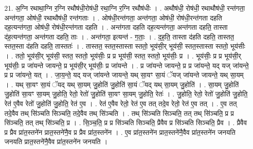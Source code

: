 \documentclass[17pt]{extarticle}
\begin{document}
21. अ॒ग्नि रथाथा॒ग्नि र॒ग्नि रथौष॑धी॒रोष॑धी॒ रथा॒ग्नि र॒ग्नि रथौष॑धीः । . अथौष॑धी॒ रोष॑धी॒ रथाथौष॑धी॒ रन्त॑गता॒ अन्त॑गता॒ ओष॑धी॒ रथाथौष॑धी॒ रन्त॑गताः । . ओष॑धी॒रन्त॑गता॒ अन्त॑गता॒ ओष॑धी॒ रोष॑धी॒रन्त॑गता दहति दह॒त्यन्त॑गता॒ ओष॑धी॒ रोष॑धी॒रन्त॑गता दहति । . अन्त॑गता दहति दह॒त्यन्त॑गता॒ अन्त॑गता दहति॒ तास्ता द॑ह॒त्यन्त॑गता॒ अन्त॑गता दहति॒ ताः । . अन्त॑गता॒ इत्यन्त॑ - ग॒ताः॒ । . द॒ह॒ति॒ तास्ता द॑हति दहति॒ तास्तत॒ स्तत॒स्ता द॑हति दहति॒ तास्ततः॑ । . तास्तत॒ स्तत॒स्तास्ता स्ततो॒ भूय॑सी॒र् भूय॑सी॒ स्तत॒स्तास्ता स्ततो॒ भूय॑सीः । . ततो॒ भूय॑सी॒र् भूय॑सी॒ स्तत॒ स्ततो॒ भूय॑सीः॒ प्र प्र भूय॑सी॒ स्तत॒ स्ततो॒ भूय॑सीः॒ प्र । . भूय॑सीः॒ प्र प्र भूय॑सी॒र् भूय॑सीः॒ प्र जा॑यन्ते जायन्ते॒ प्र भूय॑सी॒र् भूय॑सीः॒ प्र जा॑यन्ते । . प्र जा॑यन्ते जायन्ते॒ प्र प्र जा॑यन्ते॒ यद् यज् जा॑यन्ते॒ प्र प्र जा॑यन्ते॒ यत् । . जा॒य॒न्ते॒ यद् यज् जा॑यन्ते जायन्ते॒ यथ् सा॒यꣳ सा॒यं ॅयज् जा॑यन्ते जायन्ते॒ यथ् सा॒यम् । . यथ् सा॒यꣳ सा॒यं ॅयद् यथ् सा॒यम् जु॒होति॑ जु॒होति॑ सा॒यं ॅयद् यथ् सा॒यम् जु॒होति॑ । . सा॒यम् जु॒होति॑ जु॒होति॑ सा॒यꣳ सा॒यम् जु॒होति॒ रेतो॒ रेतो॑ जु॒होति॑ सा॒यꣳ सा॒यम् जु॒होति॒ रेतः॑ । . जु॒होति॒ रेतो॒ रेतो॑ जु॒होति॑ जु॒होति॒ रेत॑ ए॒वैव रेतो॑ जु॒होति॑ जु॒होति॒ रेत॑ ए॒व । . रेत॑ ए॒वैव रेतो॒ रेत॑ ए॒व तत् तदे॒व रेतो॒ रेत॑ ए॒व तत् । . ए॒व तत् तदे॒वैव तथ् सि॑ञ्चति सिञ्चति॒ तदे॒वैव तथ् सि॑ञ्चति । . तथ् सि॑ञ्चति सिञ्चति॒ तत् तथ् सि॑ञ्चति॒ प्र प्र सि॑ञ्चति॒ तत् तथ् सि॑ञ्चति॒ प्र । . सि॒ञ्च॒ति॒ प्र प्र सि॑ञ्चति सिञ्चति॒ प्रैवैव प्र सि॑ञ्चति सिञ्चति॒ प्रैव । . प्रैवैव प्र प्रैव प्रा॑त॒स्तने॑न प्रात॒स्तने॑नै॒व प्र प्रैव प्रा॑त॒स्तने॑न । . ए॒व प्रा॑त॒स्तने॑न प्रात॒स्तने॑नै॒वैव प्रा॑त॒स्तने॑न जनयति जनयति प्रात॒स्तने॑नै॒वैव प्रा॑त॒स्तने॑न जनयति । \newline
\end{document}
